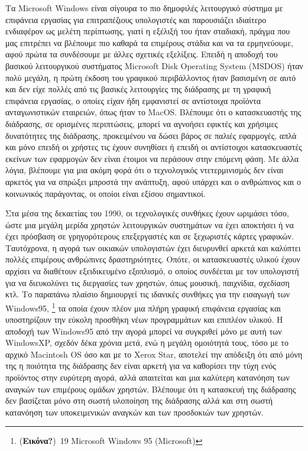 \documentclass[
]{article}
\begin{document}
Τα Microsoft Windows είναι σίγουρα το πιο δημοφιλές λειτουργικό σύστημα
με επιφάνεια εργασίας για επιτραπέζιους υπολογιστές και παρουσιάζει
ιδιαίτερο ενδιαφέρον ως μελέτη περίπτωσης, γιατί η εξέλιξή του ήταν
σταδιακή, πράγμα που μας επιτρέπει να βλέπουμε πιο καθαρά τα επιμέρους
στάδια και να τα ερμηνεύουμε, αφού πρώτα τα συνδέσουμε με άλλες σχετικές
εξελίξεις. Επειδή η αποδοχή του βασικού λειτουργικού συστήματος
Microsoft Disk Operating System (MSDOS) ήταν πολύ μεγάλη, η πρώτη έκδοση
του γραφικού περιβάλλοντος ήταν βασισμένη σε αυτό και δεν είχε πολλές
από τις βασικές λειτουργίες της διάδρασης με τη γραφική επιφάνεια
εργασίας, ο οποίες είχαν ήδη εμφανιστεί σε αντίστοιχα προϊόντα
ανταγωνιστικών εταιρειών, όπως ήταν το MacOS. Βλέπουμε ότι ο
κατασκευαστής της διάδρασης, σε ορισμένες περιπτώσεις, μπορεί να
αγνοήσει εφικτές και χρήσιμες δυνατότητες της διάδρασης, προκειμένου να
δώσει βάρος σε παλιές εφαρμογές, απλά και μόνο επειδή οι χρήστες τις
έχουν συνηθίσει ή επειδή οι αντίστοιχοι κατασκευαστές εκείνων των
εφαρμογών δεν είναι έτοιμοι να περάσουν στην επόμενη φάση. Με άλλα
λόγια, βλέπουμε για μια ακόμη φορά ότι ο τεχνολογικός ντετερμινισμός δεν
είναι αρκετός για να σπρώξει μπροστά την ανάπτυξη, αφού υπάρχει και ο
ανθρώπινος και ο κοινωνικός παράγοντας, οι οποίοι είναι εξίσου
σημαντικοί.

Στα μέσα της δεκαετίας του 1990, οι τεχνολογικές συνθήκες έχουν ωριμάσει
τόσο, ώστε μια μεγάλη μερίδα χρηστών λειτουργικών συστημάτων να έχει
αποκτήσει ή να έχει πρόσβαση σε γρηγορότερους επεξεργαστές και σε
ξεχωριστές κάρτες γραφικών. Ταυτόχρονα, η αγορά των οικιακών υπολογιστών
έχει διευρυνθεί αρκετά και καλύπτει πολλές επιμέρους ανθρώπινες
δραστηριότητες. Οπότε, οι κατασκευαστές υλικού έχουν αρχίσει να
διαθέτουν εξειδικευμένο εξοπλισμό, ο οποίος συνδέεται με τον υπολογιστή
για να διευκολύνει τις διεργασίες των χρηστών, όπως μουσική, παιχνίδια,
σχεδίαση κτλ. Το παραπάνω πλαίσιο δημιουργεί τις ιδανικές συνθήκες για
την εισαγωγή των Windows95, \footnote{(\textbf{Εικόνα?})~19 Microsoft
  Windows 95 (Microsoft)} τα οποία έχουν πλέον μια πλήρη γραφική
επιφάνεια εργασίας και υποστηρίζουν την εύκολη προσθήκη νέων
προγραμμάτων και επιπλέον υλικού. Η αποδοχή των Windows95 από την αγορά
μπορεί να συγκριθεί μόνο με αυτή των WindowsXP, σχεδόν δέκα χρόνια μετά,
ενώ η μεγάλη ομοιότητά τους, τόσο με το αρχικό Macintosh OS όσο και με
το Xerox Star, αποτελεί την απόδειξη ότι από μόνη της η ποιότητα της
διάδρασης δεν είναι αρκετή για να καθορίσει την τύχη ενός προϊόντος στην
ευρύτερη αγορά, αλλά απαιτείται και μια καλύτερη κατανόηση των αναγκών
των επιμέρους ομάδων χρηστών. Βλέπουμε ότι η κατασκευή της διάδρασης δεν
βασίζεται μόνο στη σωστή υλοποίηση της διάδρασης αλλά και στη σωστή
κατανόηση των υποκειμενικών αναγκών και των προσδοκιών των χρηστών.
\end{document}
